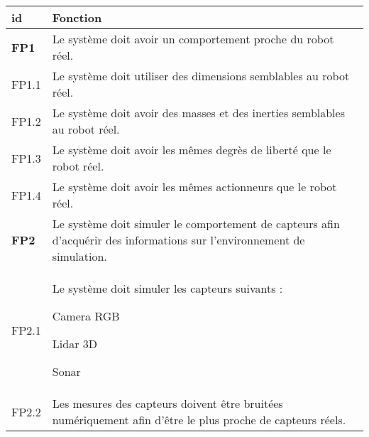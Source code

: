         \begin{table}[!htb]
            \centering
            \begin{adjustbox}{max width=\textwidth}
                \begin{tabularx}{\textwidth}{|lX|}
                    \hline
                    \cellcolor{gray!25}\textbf{id} & \cellcolor{gray!25} \textbf{Fonction} \\
                    \hline \hline
                    \cellcolor{blue!30}\textbf{FP1}&\cellcolor{blue!25} Le système doit avoir un comportement proche du robot réel. \\
                    \hline
                    \cellcolor{gray!10}FP1.1& Le système doit utiliser des dimensions semblables au robot réel. \\
                    \hline
                    \cellcolor{gray!10}FP1.2& Le système doit avoir des masses et des inerties semblables au robot réel. \\
                    \hline
                    \cellcolor{gray!10}FP1.3& Le système doit avoir les mêmes degrès de liberté que le robot réel. \\
                    \hline
                    \cellcolor{gray!10}FP1.4& Le système doit avoir les mêmes actionneurs que le robot réel. \\
            
                    \hline \hline
            
                    \cellcolor{blue!30}\textbf{FP2}&\cellcolor{blue!25} Le système doit simuler le comportement de capteurs afin d'acquérir des informations sur l'environnement de simulation. \\
                    \hline
                    \cellcolor{gray!10}FP2.1& Le système doit simuler les capteurs suivants :
                    \begin{compactitem}[\textbullet]
                        \item Camera RGB
                        \item Lidar 3D
                        \item Sonar
                    \end{compactitem} \\ [-\normalbaselineskip]
                    \hline
                    \cellcolor{gray!10}FP2.2& Les mesures des capteurs doivent être bruitées numériquement afin d'être le plus proche de capteurs réels. \\
                    \hline
            

\end{tabularx}
\end{adjustbox}
\end{table}
